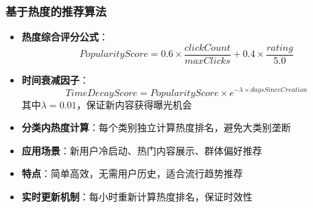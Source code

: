 \documentclass[12pt,a4paper]{article}
\begin{document}
\subsubsection{基于热度的推荐算法}
\begin{itemize}
    \item \textbf{热度综合评分公式}：
    \[PopularityScore = 0.6 \times \frac{clickCount}{maxClicks} + 0.4 \times \frac{rating}{5.0}\]
    \item \textbf{时间衰减因子}：
    \[TimeDecayScore = PopularityScore \times e^{-\lambda \times daysSinceCreation}\]
    其中\(\lambda = 0.01\)，保证新内容获得曝光机会
    \item \textbf{分类内热度计算}：每个类别独立计算热度排名，避免大类别垄断
    \item \textbf{应用场景}：新用户冷启动、热门内容展示、群体偏好推荐
    \item \textbf{特点}：简单高效，无需用户历史，适合流行趋势推荐
    \item \textbf{实时更新机制}：每小时重新计算热度排名，保证时效性
\end{itemize}
\end{document}
